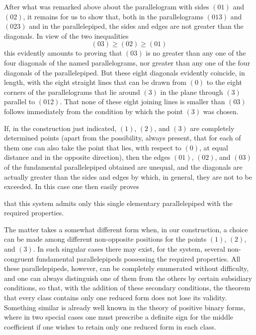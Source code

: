 \documentclass[11pt]{article}
\begin{document}
After what was remarked above about the parallelogram with sides $(01)$ and $(02)$, it remains for us to show that, both in the parallelograms $(013)$ and $(023)$ and in the parallelepiped, the sides and edges are not greater than the diagonals. In view of the two inequalities
\[
(03) \geq (02) \geq (01)
\]
this evidently amounts to proving that $(03)$ is no greater than any one of the four diagonals of the named parallelograms, nor greater than any one of the four diagonals of the parallelepiped. But these eight diagonals evidently coincide, in length, with the eight straight lines that can be drawn from $(0)$ to the eight corners of the parallelograms that lie around $(3)$ in the plane through $(3)$ parallel to $(012)$. That none of these eight joining lines is smaller than $(03)$ follows immediately from the condition by which the point $(3)$ was chosen.

If, in the construction just indicated, $(1)$, $(2)$, and $(3)$ are completely determined points (apart from the possibility, always present, that for each of them one can also take the point that lies, with respect to $(0)$, at equal distance and in the opposite direction), then the edges $(01)$, $(02)$, and $(03)$ of the fundamental parallelepiped obtained are unequal, and the diagonals are actually greater than the sides and edges by which, in general, they are not to be exceeded. In this case one then easily proves

that this system admits only this single elementary parallelepiped with the required properties.

The matter takes a somewhat different form when, in our construction, a choice can be made among different non-opposite positions for the points $(1)$, $(2)$, and $(3)$. In such singular cases there may exist, for the system, several non-congruent fundamental parallelepipeds possessing the required properties. All these parallelepipeds, however, can be completely enumerated without difficulty, and one can always distinguish one of them from the others by certain subsidiary conditions, so that, with the addition of these secondary conditions, the theorem that every class contains only one reduced form does not lose its validity. Something similar is already well known in the theory of positive binary forms, where in two special cases one must prescribe a definite sign for the middle coefficient if one wishes to retain only one reduced form in each class.
\end{document}
